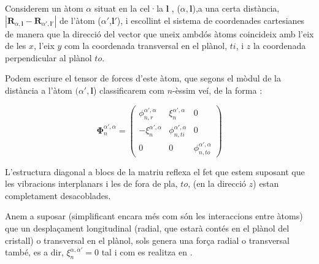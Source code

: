 \documentclass[12pt]{article} %
\let\vec\mathbf %
\begin{document}
Considerem un àtom $\alpha$ situat en la cel·la $\vec l$ , ($\alpha, \vec l$),a una certa distància, $|\vec R_{\alpha,\vec l}-\vec R_{\alpha',\vec{l'}}|$ de l'àtom  ($\alpha'$,$\vec l'$), i escollint el sistema de coordenades cartesianes de manera que la direcció del vector que uneix ambdós àtoms coincideix amb l'eix de les $x$, l'eix $y$ com la coordenada transversal en el plànol, $ti$, i $z$ la coordenada perpendicular al plànol $to$.

Podem escriure el tensor de forces d'este àtom, que segons el mòdul de la distància a l'àtom $(\alpha',\vec l$) classificarem com $n$-èssim veí, de la forma \cite{wirtz04_phonon_disper_graph_revis}:


\begin{equation}
\vec\Phi_n^{\alpha',\alpha}=\begin{pmatrix}
\phi_{n,r}^{\alpha',\alpha}&\xi_n^{\alpha',\alpha} &0\\
-\xi_n^{\alpha',\alpha} & \phi_{n,ti}^{\alpha',\alpha} & 0 \\
0 & 0 & \phi_{n,to}^{\alpha',\alpha}
\end{pmatrix}
\label{eq:tensordeforces}
\end{equation}

L'estructura diagonal a blocs de la matriu reflexa el fet que estem suposant que  les vibracions interplanars i les de fora de pla, $to$, (en la direcció $z$) estan completament desacoblades.

Anem a suposar (simplificant encara més com són les interaccions entre àtoms) que un despla\c{c}ament longitudinal (radial, que estarà contés en el plànol del cristall) o transversal en el plànol, sols genera una força radial o transversal també, es a dir, $\xi_n^{\alpha,\alpha'}=0$ tal i com es realitza en \cite{Balkanski_2000}. %





\end{document}
